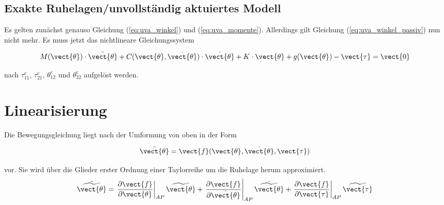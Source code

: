 \subsection{Exakte Ruhelagen/unvollständig aktuiertes Modell}
Es gelten zunächst genauso Gleichung (\ref{eq:uva_winkel}) und (\ref{eq:uva_momente}). Allerdings gilt Gleichung (\ref{eq:uva_winkel_passiv}) nun nicht mehr. Es muss jetzt das nichtlineare Gleichungssystem  

\begin{equation}
M(\vect{\theta})\cdot\ddot{\vect{\theta}}+C(\vect{\theta},\dot{\vect{\theta}})\cdot\dot{\vect{\theta}}+K\cdot\vect{\theta}+g(\vect{\theta}) - \vect{\tau} = \vect{0} 
\end{equation}

nach $\tau^e_\mathrm{11}$, $\tau^e_\mathrm{21}$, $\theta^e_\mathrm{12}$ und $\theta^e_\mathrm{22}$ aufgelöst werden.

\section{Linearisierung}
Die Bewegungsgleichung liegt nach der Umformung von oben in der Form 

\begin{equation}
\ddot{\vect{\theta}} = \vect{f}(\vect{\theta},\dot{\vect{\theta}},\vect{\tau})
\end{equation}

vor. Sie wird über die Glieder erster Ordnung einer Taylorreihe um die Ruhelage herum approximiert. 
\begin{equation}
\ddot{\widetilde{\vect{\theta}}} = \left. \dfrac{\partial \vect{f}}{\partial \vect{\theta}}\right|_{AP} \widetilde{\vect{\theta}} + 
\left. \dfrac{\partial \vect{f}}{\partial \dot{\vect{\theta}}}\right|_{AP} \dot{\widetilde{\vect{\theta}}} + 
\left. \dfrac{\partial \vect{f}}{\partial \vect{\tau}}\right|_{AP} \widetilde{\vect{\tau}} 
\end{equation}

